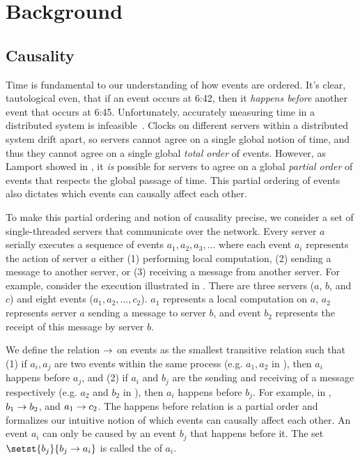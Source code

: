 \newcommand{\ttt}[1]{\texttt{#1}}

\section{Background}

\subsection{Causality}
Time is fundamental to our understanding of how events are ordered. It's clear,
tautological even, that if an event occurs at 6:42, then it \emph{happens
before} another event that occurs at 6:45. Unfortunately, accurately measuring
time in a distributed system is infeasible~\cite{marzullo1984maintaining,
sampath2012synchronization, schmid2000orthogonal}. Clocks on different servers
within a distributed system drift apart, so servers cannot agree on a single
global notion of time, and thus they cannot agree on a single global
\emph{total order} of events. However, as Lamport showed in
\cite{lamport1978time}, it \emph{is} possible for servers to agree on a global
\emph{partial order} of events that respects the global passage of time. This
partial ordering of events also dictates which events can causally affect each
other.

To make this partial ordering and notion of causality precise, we consider a
set of single-threaded servers that communicate over the network. Every server
$a$ serially executes a sequence of events $a_1, a_2, a_3, \ldots$ where each
event $a_i$ represents the action of server $a$ either (1) performing local
computation, (2) sending a message to another server, or (3) receiving a
message from another server. For example, consider the execution illustrated in
. There are three servers ($a$, $b$, and $c$) and eight
events ($a_1, a_2, \ldots, c_2$).  $a_1$ represents a local computation on $a$,
$a_2$ represents server $a$ sending a message to server $b$, and event $b_2$
represents the receipt of this message by server $b$.

{}

We define the  relation $\to$ on events as
the smallest transitive relation such that
%
(1)
  if $a_i, a_j$ are two events within the same process (e.g. $a_1, a_2$ in
  ), then $a_i$ happens before $a_j$, and
(2)
  if $a_i$ and $b_j$ are the sending and receiving of a message respectively
  (e.g. $a_2$ and $b_2$ in ), then $a_i$ happens before
  $b_j$.
%
For example, in , $b_1 \to b_2$, and $a_1
\to c_2$. The happens before relation is a partial order and
formalizes our intuitive notion of which events can causally affect each other.
An event $a_i$ can only be caused by an event $b_j$ that happens before it.
The set $\setst{b_j}{b_j \happensbefore a_i}$ is called the  of $a_i$.

